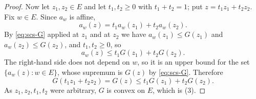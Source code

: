 \begin{proof}
Now let $z_1,z_2\in E$ and let $t_1,t_2\ge0$ with $t_1+t_2=1$; put
$z=t_1z_1+t_2z_2$. Fix $w\in E$. Since $a_w$ is affine,
\[
  a_w(z)=t_1a_w(z_1)+t_2a_w(z_2).
\]
By \eqref{eq:scs-G} applied at $z_1$ and at $z_2$ we have $a_w(z_1)\le G(z_1)$
and $a_w(z_2)\le G(z_2)$, and $t_1,t_2\ge0$, so
\[
  a_w(z)\le t_1G(z_1)+t_2G(z_2).
\]
The right-hand side does not depend on $w$, so it is an upper bound for the set
$\{a_w(z):w\in E\}$, whose supremum is $G(z)$ by \eqref{eq:scs-G}. Therefore
\[
  G(t_1z_1+t_2z_2)=G(z)\le t_1G(z_1)+t_2G(z_2).
\]
As $z_1,z_2,t_1,t_2$ were arbitrary, $G$ is convex on $E$, which is (3).
\end{proof}
